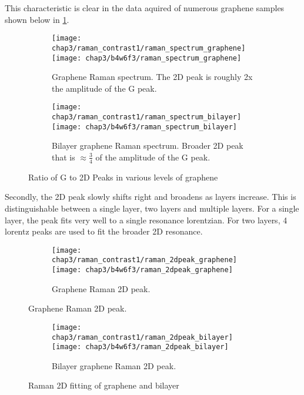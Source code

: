 \documentclass[../Matt_Gebert_Honours_Thesis.tex]{subfiles}
\begin{document}
This characteristic is clear in the data aquired of numerous graphene samples shown below in \cref{fig:raman_data_1}.
\begin{figure}[H]
	\begin{subfigure}{\textwidth}
		\texttt{[image: chap3/raman\_contrast1/raman\_spectrum\_graphene]}
		\texttt{[image: chap3/b4w6f3/raman\_spectrum\_graphene]}
		\caption{Graphene Raman spectrum. The 2D peak is roughly 2x the amplitude of the G peak.}
	\end{subfigure}
	\begin{subfigure}{\textwidth}
		\texttt{[image: chap3/raman\_contrast1/raman\_spectrum\_bilayer]}
		\texttt{[image: chap3/b4w6f3/raman\_spectrum\_bilayer]}
		\caption{Bilayer graphene Raman spectrum. Broader 2D peak that is $\approx\frac{3}{4}$ of the amplitude of the G peak.}
	\end{subfigure}
	\caption[Ratio of G to 2D peaks in graphene and bilayer]{Ratio of G to 2D Peaks in various levels of graphene}\label{fig:raman_data_1}
\end{figure}

Secondly, the 2D peak slowly shifts right and broadens as layers increase. This is distinguishable between a single layer, two layers and multiple layers. For a single layer, the peak fits very well to a single resonance lorentzian. For two layers, 4 lorentz peaks are used to fit the broader 2D resonance.

\begin{figure}[H]
	\begin{subfigure}{\textwidth}
		\texttt{[image: chap3/raman\_contrast1/raman\_2dpeak\_graphene]}
		\texttt{[image: chap3/b4w6f3/raman\_2dpeak\_graphene]}
		\caption{Graphene Raman 2D peak.}
	\end{subfigure}
\end{figure}
\begin{figure}[H]
	\ContinuedFloat
	\begin{subfigure}{\textwidth}
		\texttt{[image: chap3/raman\_contrast1/raman\_2dpeak\_bilayer]}
		\texttt{[image: chap3/b4w6f3/raman\_2dpeak\_bilayer]}
		\caption{Bilayer graphene Raman 2D peak.}
	\end{subfigure}
	\caption{Raman 2D fitting of graphene and bilayer}\label{fig:raman_data_2}
\end{figure}
\end{document}
